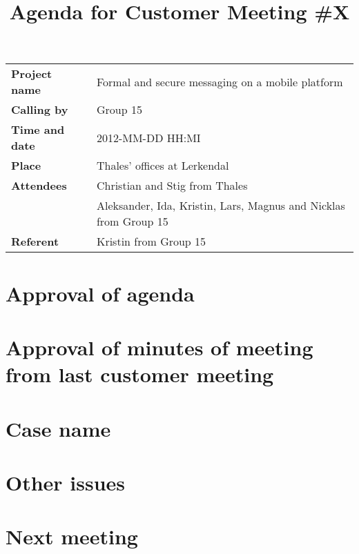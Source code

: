 \documentclass[a4paper,12pt]{article}
\begin{document}
\title{Agenda for Customer Meeting \#X}
\maketitle
\begin{tabular}{>{\bfseries}l l}	
Project name&Formal and secure messaging on a mobile platform\\
Calling by&Group 15\\
Time and date&2012-MM-DD HH:MI\\
Place&Thales' offices at Lerkendal\\
Attendees&Christian and Stig from Thales\\
& Aleksander, Ida, Kristin, Lars, Magnus and Nicklas from Group 15 \\
Referent&Kristin from Group 15\\
\end{tabular}

\section{Approval of agenda}
\section{Approval of minutes of meeting from last customer meeting}
\section{Case name}
\section{Other issues}
\section{Next meeting}
\end{document}
